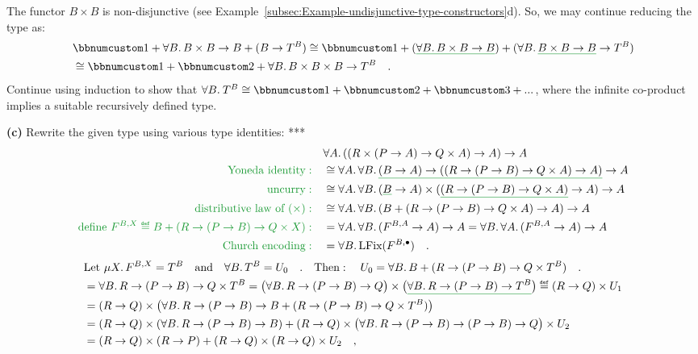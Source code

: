 The functor $B\times B$ is non-disjunctive (see Example~\ref{subsec:Example-undisjunctive-type-constructors}d).
So, we may continue reducing the type as:
\begin{align*}
 & \bbnum 1+\forall B.\,B\times B\rightarrow B+(B\rightarrow T^{B})\cong\bbnum 1+(\gunderline{\forall B.\,B\times B\rightarrow B})+(\forall B.\,\gunderline{B\times B\rightarrow B}\rightarrow T^{B})\\
 & \cong\bbnum 1+\bbnum 2+\forall B.\,B\times B\times B\rightarrow T^{B}\quad.
\end{align*}
Continue using induction to show that $\forall B.\:T^{B}\cong\bbnum 1+\bbnum 2+\bbnum 3+...$,
where the infinite co-product implies a suitable recursively defined
type.

\textbf{(c)} Rewrite the given type using various type identities:
{*}{*}{*}
\begin{align*}
 & \forall A.\,((R\times(P\rightarrow A)\rightarrow Q\times A)\rightarrow A)\rightarrow A\\
{\color{greenunder}\text{Yoneda identity}:}\quad & \cong\forall A.\,\forall B.\,\gunderline{(B\rightarrow A)\rightarrow((R\rightarrow(P\rightarrow B)\rightarrow Q\times A)\rightarrow A)}\rightarrow A\\
{\color{greenunder}\text{uncurry}:}\quad & \cong\forall A.\,\forall B.\,(\gunderline B\rightarrow A)\times(\gunderline{(R\rightarrow(P\rightarrow B)\rightarrow Q\times A)}\rightarrow A)\rightarrow A\\
{\color{greenunder}\text{distributive law of }(\times):}\quad & \cong\forall A.\,\forall B.\,(B+(R\rightarrow(P\rightarrow B)\rightarrow Q\times A)\rightarrow A)\rightarrow A\\
{\color{greenunder}\text{define }F^{B,X}\triangleq B+(R\rightarrow(P\rightarrow B)\rightarrow Q\times X):}\quad & =\forall A.\,\forall B.\,(F^{B,A}\rightarrow A)\rightarrow A=\forall B.\,\forall A.\,(F^{B,A}\rightarrow A)\rightarrow A\\
{\color{greenunder}\text{Church encoding}:}\quad & =\forall B.\,\text{LFix}(F^{B,\bullet})\quad.
\end{align*}
\begin{align*}
 & \text{Let }\mu X.\,F^{B,X}=T^{B}\quad\text{and}\quad\forall B.\,T^{B}=U_{0}\quad.\quad\text{Then}:\quad U_{0}=\forall B.\,B+(R\rightarrow(P\rightarrow B)\rightarrow Q\times T^{B})\quad.\\
 & =\forall B.\,R\rightarrow(P\rightarrow B)\rightarrow Q\times T^{B}=\big(\forall B.\,R\rightarrow(P\rightarrow B)\rightarrow Q\big)\times\big(\gunderline{\forall B.\,R\rightarrow(P\rightarrow B)\rightarrow T^{B}}\big)\triangleq(R\rightarrow Q)\times U_{1}\\
 & =(R\rightarrow Q)\times\big(\forall B.\,R\rightarrow(P\rightarrow B)\rightarrow B+(R\rightarrow(P\rightarrow B)\rightarrow Q\times T^{B})\big)\\
 & =(R\rightarrow Q)\times(\forall B.\,R\rightarrow(P\rightarrow B)\rightarrow B)+(R\rightarrow Q)\times\big(\forall B.\,R\rightarrow(P\rightarrow B)\rightarrow(P\rightarrow B)\rightarrow Q\big)\times U_{2}\\
 & =(R\rightarrow Q)\times(R\rightarrow P)+(R\rightarrow Q)\times(R\rightarrow Q)\times U_{2}\quad,
\end{align*}
